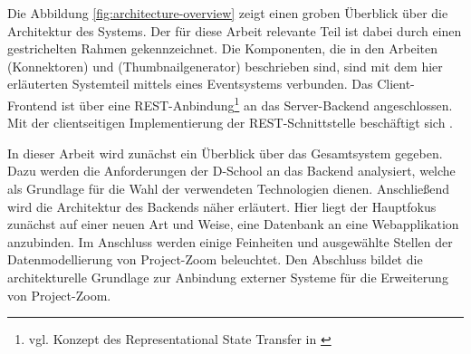 Die Abbildung \ref{fig:architecture-overview} zeigt einen groben Überblick über die Architektur des Systems. Der für diese Arbeit relevante Teil ist dabei durch einen gestrichelten Rahmen gekennzeichnet. Die Komponenten, die in den Arbeiten \cite{bp-tewe} (Konnektoren) und \cite{bp-dome} (Thumbnailgenerator) beschrieben sind, sind mit dem hier erläuterten Systemteil mittels eines Eventsystems verbunden. Das Client-Frontend ist über eine REST-Anbindung\footnote{vgl. Konzept des Representational State Transfer in \cite{rest}} an das Server-Backend angeschlossen. Mit der clientseitigen Implementierung der REST-Schnittstelle beschäftigt sich \cite{bp-norman}.

In dieser Arbeit wird zunächst ein Überblick über das Gesamtsystem gegeben. Dazu werden die Anforderungen der D-School an das Backend analysiert, welche als Grundlage für die Wahl der verwendeten Technologien dienen. Anschließend wird die Architektur des Backends näher erläutert. Hier liegt der Hauptfokus zunächst auf einer neuen Art und Weise, eine Datenbank an eine Webapplikation anzubinden. Im Anschluss werden einige Feinheiten und ausgewählte Stellen der Datenmodellierung von Project-Zoom beleuchtet. Den Abschluss bildet die architekturelle Grundlage zur Anbindung externer Systeme für die Erweiterung von Project-Zoom.